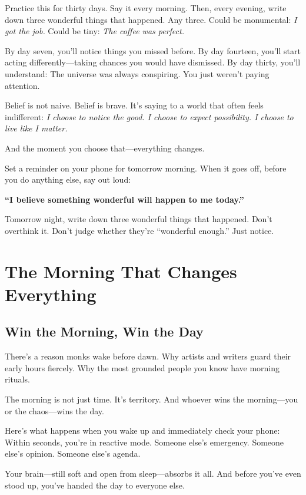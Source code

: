 \documentclass[11pt, a5paper, openright]{book}
\begin{document}
Practice this for thirty days. Say it every morning. Then, every evening, write down three wonderful things that happened. Any three. Could be monumental: \textit{I got the job.} Could be tiny: \textit{The coffee was perfect.}

By day seven, you'll notice things you missed before. By day fourteen, you'll start acting differently—taking chances you would have dismissed. By day thirty, you'll understand: The universe was always conspiring. You just weren't paying attention.

Belief is not naive. Belief is brave. It's saying to a world that often feels indifferent: \textit{I choose to notice the good. I choose to expect possibility. I choose to live like I matter.}

And the moment you choose that—everything changes.

\begin{reflectionbox}
Set a reminder on your phone for tomorrow morning. When it goes off, before you do anything else, say out loud:

\textbf{``I believe something wonderful will happen to me today.''}

Tomorrow night, write down three wonderful things that happened. Don't overthink it. Don't judge whether they're ``wonderful enough.'' Just notice.
\end{reflectionbox}

\part{The Morning That Changes Everything}

\chapter{Win the Morning, Win the Day}

There's a reason monks wake before dawn. Why artists and writers guard their early hours fiercely. Why the most grounded people you know have morning rituals.

The morning is not just time. It's territory. And whoever wins the morning—you or the chaos—wins the day.

Here's what happens when you wake up and immediately check your phone: Within seconds, you're in reactive mode. Someone else's emergency. Someone else's opinion. Someone else's agenda.

Your brain—still soft and open from sleep—absorbs it all. And before you've even stood up, you've handed the day to everyone else.
\end{document}
